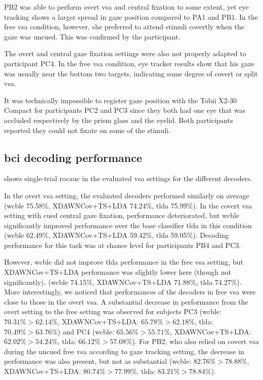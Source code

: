 PB2 was able to perform overt \ac{vsa} and central fixation to some extent,
yet eye tracking shows a larger spread in gaze position compared to
PA1 and PB1.
In the free \ac{vsa} condition, however, she preferred to attend
stimuli covertly when the gaze was uncued.
This was confirmed by the participant.

The overt and central gaze fixation settings were also not properly adapted to
participant PC4.
In the free \ac{vsa} condition, eye tracker results show that his gaze was usually near the
bottom two targets, indicating some degree of covert or split \ac{vsa}.

It was technically impossible to register gaze position with the Tobii X2-30
Compact for participants PC2 and PC3 since they both had one eye that was
occluded respectively by the prism glass and the eyelid.
Both participants reported they could not fixate on some of the
stimuli.

\subsection{\Acs{bci} decoding performance}

 shows single-trial
\ac{rocauc} in the evaluated \ac{vsa} settings for the different decoders.


In the overt \ac{vsa} setting, the evaluated decoders performed similarly on average
(\ac{wcble} 75.58\%, XDAWNCov+TS+LDA 74.24\%, \ac{tlda} 75.99\%).
In the covert \ac{vsa} setting with cued central gaze fixation, performance deteriorated,
but \ac{wcble} significantly improved performance over the base classifier
\ac{tlda} in this condition
(\ac{wcble} 62.49\%, XDAWNCov+TS+LDA 59.42\%, \ac{tlda} 59.05\%).
Decoding performance for this task was at chance level for participants PB4 and
PC3.

However, \ac{wcble} did not improve \ac{tlda} performance in the free \ac{vsa} setting, but
XDAWNCov+TS+LDA performance was slightly lower here (though not
significantly).
(\ac{wcble} 74.15\%, XDAWNCov+TS+LDA 71.88\%, \ac{tlda} 74.27\%).
More interestingly, we noticed that performances of the decoders in free
\ac{vsa} were close to those in the overt \ac{vsa}.
A substantial decrease in performance from the overt setting to the free
setting was observed for subjects PC3
(\ac{wcble}: $70.31\%>62.14\%$, XDAWNCov+TS+LDA: $65.78\%>62.18\%$, \ac{tlda}:
$70.49\%>63.76\%$)
and PC4
(\ac{wcble}: $65.56\%>55.71\%$, XDAWNCov+TS+LDA: $62.02\%>54.24\%$, \ac{tlda}:
$66.12\%>57.08\%$).
For PB2, who also relied on covert \ac{vsa} during the uncued free \ac{vsa}
according to gaze tracking setting, the decrease in performance was also
present, but not as substantial
(\ac{wcble}: $82.76\%>78.88\%$, XDAWNCov+TS+LDA: $80.74\%>77.99\%$, \ac{tlda}:
$83.21\%>78.84\%$).

